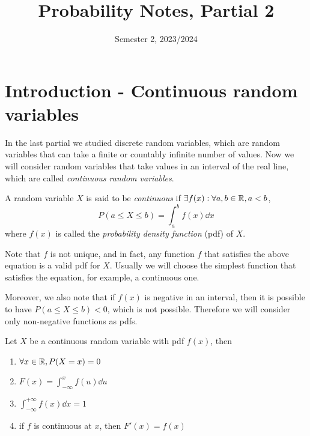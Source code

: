 \documentclass[12pt]{extarticle}
\title{Probability Notes, Partial 2}
\date{Semester 2, 2023/2024}
\begin{document}
\maketitle
\tableofcontents
\clearpage

\section{Introduction - Continuous random variables}

In the last partial we studied discrete random variables, which are random variables that can take a finite or countably infinite number of values.
Now we will consider random variables that take values in an interval of the real line, which are called \emph{continuous random variables}.

\begin{definition}
    \label{def:continuous_random_variable}

    A random variable $X$ is said to be \emph{continuous} if $\exists f(x) : \forall a, b \in \mathbb{R}, a < b$,
    \begin{equation}
        P(a \leq X \leq b) = \int_a^b f(x) \dd{x}
    \end{equation}
    where $f(x)$ is called the \emph{probability density function} (pdf) of $X$.
\end{definition}

Note that $f$ is not unique, and in fact, any function $f$ that satisfies the above equation is a valid pdf for $X$. Usually we will choose the simplest function that satisfies the equation, for example, a continuous one.

Moreover, we also note that if $f(x)$ is negative in an interval, then it is possible to have $P(a \leq X \leq b) < 0$, which is not possible.
Therefore we will consider only non-negative functions as pdfs.

\begin{proposition}
    \label{prop:properties_of_pdf}
    Let $X$ be a continuous random variable with pdf $f(x)$, then

    \begin{enumerate}[label=\roman*)]
        \item $\forall x \in \mathbb{R}, P(X = x) = 0$
        \item $F(x) = \int_{-\infty}^x f(u) \dd{u}$ \item $\int_{-\infty}^{+\infty} f(x) \dd{x} = 1$
        \item if $f$ is continuous at $x$, then $F'(x) = f(x)$
    \end{enumerate}
\end{proposition}
\end{document}
